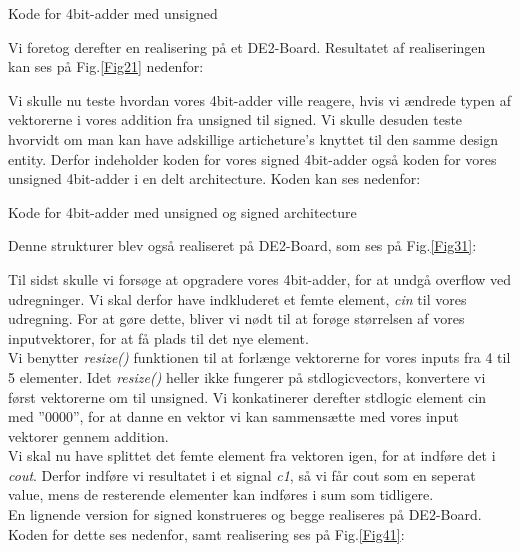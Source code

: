 \documentclass[../journal2.tex]{subfiles}
\begin{document}
\begin{table}[H]
    \centering
      \framebox{
        \rule{8pt}{0pt}
          
  }
  \caption{Kode for 4bit-adder med unsigned}	
  \label{src:Tab21}
\end{table}

Vi foretog derefter en realisering på et DE2-Board. Resultatet af realiseringen kan ses på Fig.\ref{Fig21} nedenfor:


Vi skulle nu teste hvordan vores 4bit-adder ville reagere, hvis vi ændrede typen af vektorerne i vores addition fra unsigned til signed. Vi skulle desuden teste hvorvidt om man kan have adskillige articheture's knyttet til den samme design entity. Derfor indeholder koden for vores signed 4bit-adder også koden for vores unsigned 4bit-adder i en delt architecture. Koden kan ses nedenfor:

\begin{table}[H]
    \centering
      \framebox{
        \rule{8pt}{0pt}
          
  }
  \caption{Kode for 4bit-adder med unsigned og signed architecture}	
  \label{src:Tab31}
\end{table}

Denne strukturer blev også realiseret på DE2-Board, som ses på Fig.\ref{Fig31}:


Til sidst skulle vi forsøge at opgradere vores 4bit-adder, for at undgå overflow ved udregninger. Vi skal derfor have indkluderet et femte element, \textit{c\textunderscore in} til vores udregning. For at gøre dette, bliver vi nødt til at forøge størrelsen af vores inputvektorer, for at få plads til det nye element.\\
Vi benytter \textit{resize()} funktionen til at forlænge vektorerne for vores inputs fra 4 til 5 elementer. Idet \textit{resize()} heller ikke fungerer på std\textunderscore logic\textunderscore vectors, konvertere vi først vektorerne om til unsigned. Vi konkatinerer derefter std\textunderscore logic element c\textunderscore in med ''0000'', for at danne en vektor vi kan sammensætte med vores input vektorer gennem addition.\\
Vi skal nu have splittet det femte element fra vektoren igen, for at indføre det i \textit{c\textunderscore out}. Derfor indføre vi resultatet i et signal \textit{c1}, så vi får c\textunderscore out som en seperat value, mens de resterende elementer kan indføres i sum som tidligere.\\
En lignende version for signed konstrueres og begge realiseres på DE2-Board.  Koden for dette ses nedenfor, samt realisering ses på Fig.\ref{Fig41}:
\end{document}
